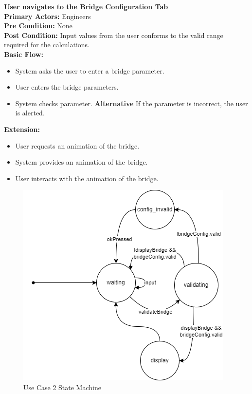 \documentclass[12pt]{article}
\begin{document}
\noindent
\textbf{User navigates to the Bridge Configuration Tab} \\
\textbf{  Primary Actors:} Engineers\\
\textbf{  Pre Condition:} None\\
\textbf{  Post Condition:} Input values from the user conforms to the valid range required for the calculations.\\ 
\textbf{  Basic Flow:} 
\begin{itemize}
\item System asks the user to enter a bridge parameter. 
\item User enters the bridge parameters. 
\item System checks parameter.
\subitem \textbf{Alternative} If the parameter is incorrect, the user is alerted.
\end{itemize}
\textbf{  Extension:}
\begin{itemize}
\item User requests an animation of the bridge. 
\item System provides an animation of the bridge.
\item User interacts with the animation of the bridge.
\end{itemize}
\begin{figure}[H]
  \centering
  \includegraphics[width=0.5\linewidth]{use-case-2-sm.png}
  \caption{Use Case 2 State Machine}
  \label {fig:use-case-2-sm}
\end{figure}
\end{document}
